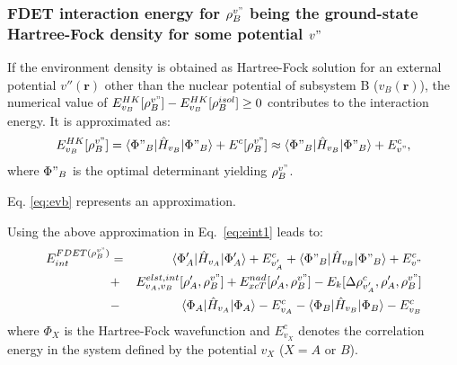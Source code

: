 \documentclass[amsmath,amssymb,preprint,aip,jcp]{revtex4-1}
\begin{document}
\subsubsection{FDET interaction energy for $\rho_B^{v"}$ being the ground-state Hartree-Fock density for some 
 potential $v"$} 
If the environment density is obtained as Hartree-Fock solution for an external potential $v''(\mathbf{r})$ other than the nuclear potential of subsystem B ($v_B(\mathbf{r})$), the numerical value of 
${E}^{HK}_{v_B}[\rho_B^{v"}]-{E}^{HK}_{v_B}[\rho_B^{isol}]\ge 0$ contributes to the interaction energy. 
It is approximated as:
\begin{eqnarray}
{E}^{HK}_{v_B}[\rho_B^{v"}]=\langle\Phi"_{B}\vert \hat{H}_{v_B}\vert \Phi"_{B}\rangle+E^{c}[\rho_B^{v"}] \approx \langle\Phi"_{B}\vert \hat{H}_{v_B}\vert \Phi"_{B}\rangle+E^{c}_{v"}, \label{eq:evb} 
\end{eqnarray}
where $\Phi"_{B}$ is the optimal determinant yielding $\rho_B^{v"}$.

Eq. \ref{eq:evb} represents an approximation. 

Using the above approximation in Eq.~\ref{eq:eint1} leads to:
 \begin{eqnarray}
E_{int}^{FDET(\rho_B^{v"})} 
&=& \langle\Phi'_{A}\vert \hat{H}_{v_A}\vert \Phi'_{A}\rangle + E^{c}_{v'_A} + \langle\Phi"_{B}\vert \hat{H}_{v_B}\vert \Phi"_{B}\rangle + E^{c}_{v"} \label{eq:eint3}\\ \nonumber
&+& E^{elst,int}_{v_A,v_B}[\rho'_A,\rho_B^{v"}] + {E}_{xcT}^{nad}[\rho'_A,\rho_B^{v"}]- E_k[\Delta \rho^{c}_{v'_A}, \rho'_A, \rho_B^{v"}] \nonumber\\
&-& 
\langle\Phi_{A}\vert \hat{H}_{v_A}\vert \Phi_{A}\rangle - E^{c}_{v_A}
- \langle\Phi_{B}\vert \hat{H}_{v_B}\vert \Phi_{B}\rangle - E^{c}_{v_B}\nonumber
\end{eqnarray}
where $\Phi_{X}$ is the Hartree-Fock wavefunction and $E^{c}_{v_X}$ denotes the correlation energy in the system defined by the potential $v_X$ ($X=A$ or $B$).
\end{document}
